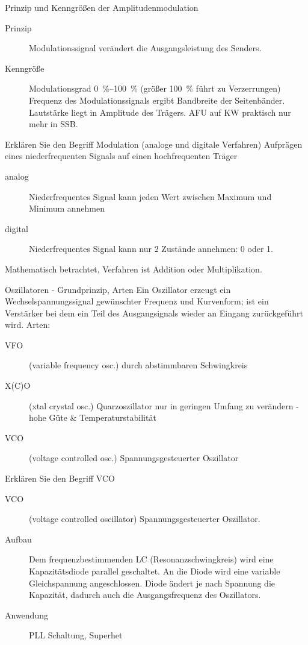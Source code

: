 \documentclass[avery5371,grid,frame,a4paper]{flashcards}
\newcommand{\card}[3]{
  \begin{flashcard}[{\chap} -- #1]{#2}#3\end{flashcard}
}
\begin{document}
\card{50}{Prinzip und Kenngrößen der Amplitudenmodulation}{
  \begin{description}
    \item[Prinzip]
      Modulationssignal verändert die Ausgangsleistung des Senders.
    \item[Kenngröße]
      Modulationsgrad \SIrange{0}{100}{\percent} (größer \SI{100}{\percent} führt zu Verzerrungen)
        Frequenz des Modulationssignals ergibt Bandbreite der Seitenbänder.
        Lautstärke liegt in Amplitude des Trägers.
        AFU auf KW praktisch nur mehr in SSB.
  \end{description}
}
\card{51}{Erklären Sie den Begriff Modulation (analoge und digitale Verfahren)}{
  Aufprägen eines niederfrequenten Signals auf einen hochfrequenten Träger

  \begin{description}
    \item[analog] Niederfrequentes Signal kann jeden Wert zwischen Maximum und Minimum annehmen
    \item[digital] Niederfrequentes Signal kann nur 2 Zustände annehmen: 0 oder 1.
  \end{description}

  Mathematisch betrachtet, Verfahren ist Addition oder Multiplikation.
}
\card{52}{Oszillatoren - Grundprinzip, Arten}{
  \small
  Ein Oszillator erzeugt ein Wechselspannungssignal gewünschter Frequenz und Kurvenform; ist ein Verstärker bei dem ein Teil des Ausgangsignals wieder an Eingang zurückgeführt wird. Arten:
  \begin{description}
    \item[VFO]
      (variable frequency osc.)
      durch abstimmbaren Schwingkreis
    \item[X(C)O]
      (xtal crystal osc.)
      Quarzoszillator nur in geringen Umfang zu verändern - hohe Güte \& Temperaturstabilität
    \item[VCO]
      (voltage controlled osc.)
      Spannungsgesteuerter Oszillator
  \end{description}
}
\card{53}{Erklären Sie den Begriff VCO}{
  \begin{description}
    \item[VCO] (voltage controlled oscillator)
      Spannungsgesteuerter Oszillator.
    \item[Aufbau]
      Dem frequenzbestimmenden LC (Resonanzschwingkreis) wird eine Kapazitätsdiode parallel geschaltet.
      An die Diode wird eine variable Gleichspannung angeschlossen.
      Diode ändert je nach Spannung die Kapazität, dadurch auch die Ausgangsfrequenz des Oszillators.
    \item[Anwendung] PLL Schaltung, Superhet
  \end{description}
}
\end{document}
